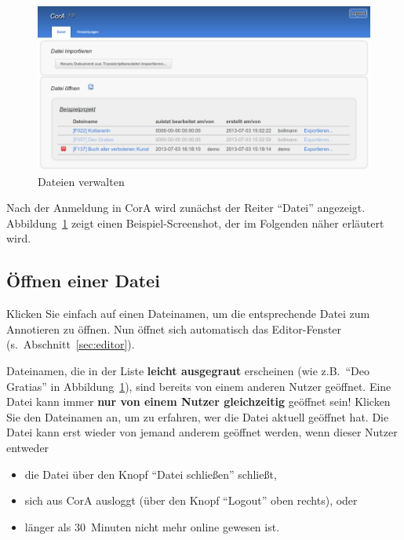 \documentclass[11pt,a4paper,parskip=half]{scrartcl}
\begin{document}
\begin{figure}[!b]
  \centering
  \includegraphics[width=\linewidth]{img/datei.png}
  \caption{Dateien verwalten}
  \label{fig:datei}
\end{figure}

Nach der Anmeldung in CorA wird zunächst der Reiter "`Datei"'
angezeigt.  Abbildung~\ref{fig:datei} zeigt einen Beispiel-Screenshot,
der im Folgenden näher erläutert wird.


\subsection{Öffnen einer Datei}

Klicken Sie einfach auf einen Dateinamen, um die entsprechende Datei
zum Annotieren zu öffnen.  Nun öffnet sich automatisch das
Editor-Fenster (s.\ Abschnitt~\ref{sec:editor}).

Dateinamen, die in der Liste \textbf{leicht ausgegraut} erscheinen
(wie z.B.\ "`Deo Gratias"' in Abbildung~\ref{fig:datei}), sind bereits
von einem anderen Nutzer geöffnet.  Eine Datei kann immer \textbf{nur
  von einem Nutzer gleichzeitig} geöffnet sein!  Klicken Sie den
Dateinamen an, um zu erfahren, wer die Datei aktuell geöffnet hat.
Die Datei kann erst wieder von jemand anderem geöffnet werden, wenn
dieser Nutzer entweder
\begin{itemize}
\item die Datei über den Knopf "`Datei schließen"' schließt,
\item sich aus CorA ausloggt (über den Knopf "`Logout"' oben rechts),
  oder
\item länger als 30~Minuten nicht mehr online gewesen ist.
\end{itemize}
\end{document}
